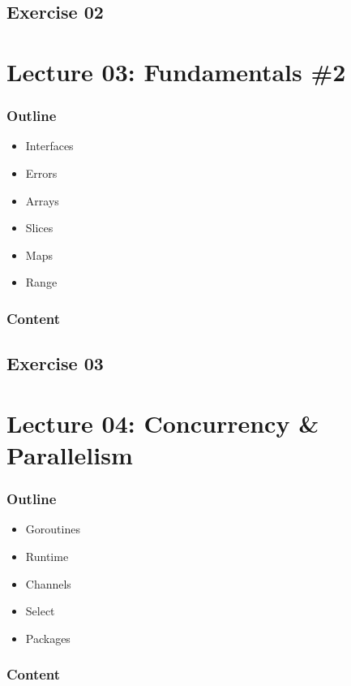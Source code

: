 \documentclass[
  digital,
  color,
  oneside,
  nosansbold,
  nocolorbold,
  lof,
  lot,
]{fithesis4}
\begin{document}
\subsection{Exercise 02}

\section{Lecture 03: Fundamentals \#2}

\subsubsection{Outline}

\begin{itemize}
    \item Interfaces
    \item Errors
    \item Arrays
    \item Slices
    \item Maps
    \item Range
\end{itemize}

\subsubsection{Content}

\subsection{Exercise 03}

\section{Lecture 04: Concurrency \& Parallelism}

\subsubsection{Outline}

\begin{itemize}
    \item Goroutines
    \item Runtime
    \item Channels
    \item Select
    \item Packages
\end{itemize}

\subsubsection{Content}
\end{document}
